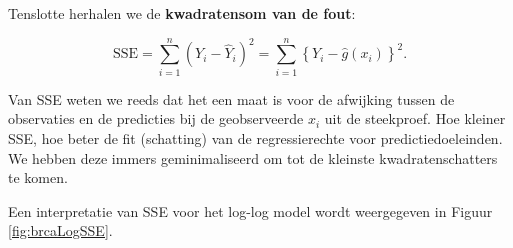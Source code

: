 \documentclass[
  12pt,dutch,coursenotes]{book}
\newenvironment{Shaded}{\begin{snugshade}}{\end{snugshade}}
\newcommand{\DataTypeTok}[1]{\textcolor[rgb]{0.13,0.29,0.53}{#1}}
\newcommand{\DecValTok}[1]{\textcolor[rgb]{0.00,0.00,0.81}{#1}}
\newcommand{\FloatTok}[1]{\textcolor[rgb]{0.00,0.00,0.81}{#1}}
\newcommand{\KeywordTok}[1]{\textcolor[rgb]{0.13,0.29,0.53}{\textbf{#1}}}
\newcommand{\NormalTok}[1]{#1}
\newcommand{\OperatorTok}[1]{\textcolor[rgb]{0.81,0.36,0.00}{\textbf{#1}}}
\newcommand{\OtherTok}[1]{\textcolor[rgb]{0.56,0.35,0.01}{#1}}
\newcommand{\StringTok}[1]{\textcolor[rgb]{0.31,0.60,0.02}{#1}}
\theoremstyle{definition}
\theoremstyle{definition}
\theoremstyle{definition}
\theoremstyle{remark}
\begin{document}
Tenslotte herhalen we de \textbf{kwadratensom van de fout}:

\[ \text{SSE} = \sum_{i=1}^n (Y_i-\hat{Y}_i )^2 = \sum_{i=1}^n \left\{Y_i-\hat{g}\left(x_i\right)\right\}^2.\]

Van SSE weten we reeds dat het een maat is voor de afwijking tussen de observaties en de predicties bij de geobserveerde \(x_i\) uit de steekproef.
Hoe kleiner SSE, hoe beter de fit (schatting) van de regressierechte voor predictiedoeleinden. We hebben deze immers geminimaliseerd om tot de kleinste kwadratenschatters te komen.

Een interpretatie van SSE voor het log-log model wordt weergegeven in Figuur \ref{fig:brcaLogSSE}.

\begin{Shaded}
\end{Shaded}
\end{document}

